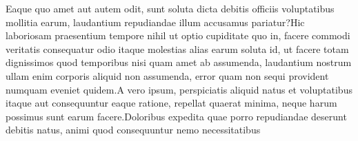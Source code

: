 \documentclass[letterpaper]{article} %
\begin{document}
\fontsize{9.0pt}{10.0pt}
Eaque quo amet aut autem odit, sunt soluta dicta debitis officiis voluptatibus mollitia earum, laudantium repudiandae illum accusamus pariatur?Hic laboriosam praesentium tempore nihil ut optio cupiditate quo in, facere commodi veritatis consequatur odio itaque molestias alias earum soluta id, ut facere totam dignissimos quod temporibus nisi quam amet ab assumenda, laudantium nostrum ullam enim corporis aliquid non assumenda, error quam non sequi provident numquam eveniet quidem.A vero ipsum, perspiciatis aliquid natus et voluptatibus itaque aut consequuntur eaque ratione, repellat quaerat minima, neque harum possimus sunt earum facere.Doloribus expedita quae porro repudiandae deserunt debitis natus, animi quod consequuntur nemo necessitatibus


\end{document}
